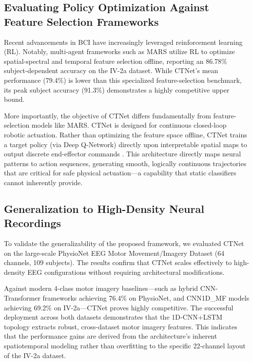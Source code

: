 \documentclass[twocolumn]{article}
\begin{document}
\subsection{Evaluating Policy Optimization Against Feature Selection Frameworks}

Recent advancements in BCI have increasingly leveraged reinforcement learning (RL). Notably, multi-agent frameworks such as MARS \cite{shin2024mars} utilize RL to optimize spatial-spectral and temporal feature selection offline, reporting an 86.78\% subject-dependent accuracy on the IV-2a dataset. While CTNet's mean performance (79.4\%) is lower than this specialized feature-selection benchmark, its peak subject accuracy (91.3\%) demonstrates a highly competitive upper bound.

More importantly, the objective of CTNet differs fundamentally from feature-selection models like MARS. CTNet is designed for continuous closed-loop robotic actuation. Rather than optimizing the feature space offline, CTNet trains a target policy (via Deep Q-Network) directly upon interpretable spatial maps to output discrete end-effector commands \cite{nallani2024rleegnet}. This architecture directly maps neural patterns to action sequences, generating smooth, logically continuous trajectories that are critical for safe physical actuation---a capability that static classifiers cannot inherently provide.

\subsection{Generalization to High-Density Neural Recordings}

To validate the generalizability of the proposed framework, we evaluated CTNet on the large-scale PhysioNet EEG Motor Movement/Imagery Dataset (64 channels, 109 subjects). The results confirm that CTNet scales effectively to high-density EEG configurations without requiring architectural modifications.

Against modern 4-class motor imagery baselines---such as hybrid CNN-Transformer frameworks achieving 76.4\% on PhysioNet, and CNN1D\_MF models achieving 69.2\% on IV-2a---CTNet proves highly competitive. The successful deployment across both datasets demonstrates that the 1D-CNN+LSTM topology extracts robust, cross-dataset motor imagery features. This indicates that the performance gains are derived from the architecture's inherent spatiotemporal modeling rather than overfitting to the specific 22-channel layout of the IV-2a dataset.
\end{document}
